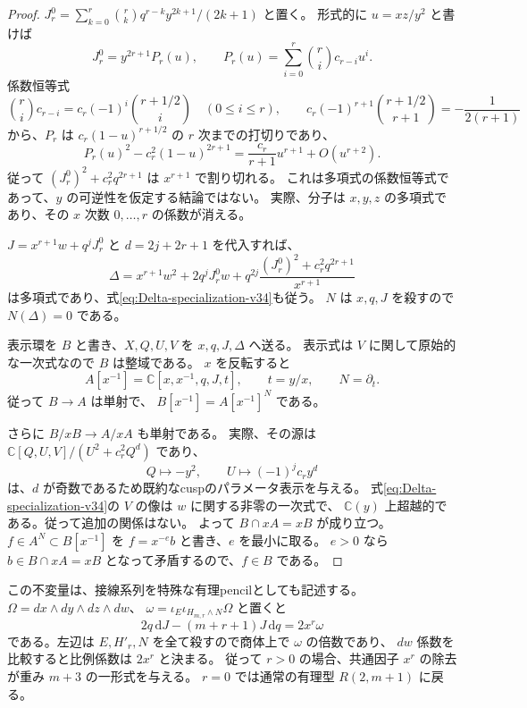 \begin{proof}
$J_r^0=\sum_{k=0}^r\binom rk q^{r-k}y^{2k+1}/(2k+1)$ と置く。
形式的に $u=xz/y^2$ と書けば
\[
 J_r^0=y^{2r+1}P_r(u),\qquad
 P_r(u)=\sum_{i=0}^r\binom ri c_{r-i}u^i.
\]
係数恒等式
\[
 \binom ri c_{r-i}
 =c_r(-1)^i\binom{r+1/2}{i}\quad(0\le i\le r),\qquad
 c_r(-1)^{r+1}\binom{r+1/2}{r+1}=-\frac1{2(r+1)}
\]
から、$P_r$ は $c_r(1-u)^{r+1/2}$ の $r$ 次までの打切りであり、
\[
 P_r(u)^2-c_r^2(1-u)^{2r+1}
 =\frac{c_r}{r+1}u^{r+1}+O(u^{r+2}).
\]
従って $(J_r^0)^2+c_r^2q^{2r+1}$ は $x^{r+1}$ で割り切れる。
これは多項式の係数恒等式であって、$y$ の可逆性を仮定する結論ではない。
実際、分子は $x,y,z$ の多項式であり、その $x$ 次数 $0,\ldots,r$ の係数が消える。

$J=x^{r+1}w+q^jJ_r^0$ と $d=2j+2r+1$ を代入すれば、
\[
 \Delta=x^{r+1}w^2+2q^jJ_r^0w
       +q^{2j}\frac{(J_r^0)^2+c_r^2q^{2r+1}}{x^{r+1}}
\]
は多項式であり、式\eqref{eq:Delta-specialization-v34}も従う。
$N$ は $x,q,J$ を殺すので $N(\Delta)=0$ である。

表示環を $B$ と書き、$X,Q,U,V$ を $x,q,J,\Delta$ へ送る。
表示式は $V$ に関して原始的な一次式なので $B$ は整域である。
$x$ を反転すると
\[
 A[x^{-1}]=\mathbb C[x,x^{-1},q,J,t],\qquad t=y/x,\qquad N=\partial_t.
\]
従って $B\to A$ は単射で、
$B[x^{-1}]=A[x^{-1}]^N$ である。

さらに $B/xB\to A/xA$ も単射である。
実際、その源は
$\mathbb C[Q,U,V]/(U^2+c_r^2Q^d)$ であり、
\[
 Q\longmapsto-y^2,\qquad U\longmapsto(-1)^jc_ry^d
\]
は、$d$ が奇数であるため既約なcuspのパラメータ表示を与える。
式\eqref{eq:Delta-specialization-v34}の $V$ の像は $w$ に関する非零の一次式で、
$\mathbb C(y)$ 上超越的である。従って追加の関係はない。
よって $B\cap xA=xB$ が成り立つ。
$f\in A^N\subset B[x^{-1}]$ を $f=x^{-e}b$ と書き、$e$ を最小に取る。
$e>0$ なら $b\in B\cap xA=xB$ となって矛盾するので、$f\in B$ である。
\end{proof}

この不変量は、接線系列を特殊な有理pencilとしても記述する。
$\Omega=dx\wedge dy\wedge dz\wedge dw$、
$\omega=\iota_E\iota_{H_{m,r}\wedge N}\Omega$ と置くと
\[
 2q\,\mathrm dJ-(m+r+1)J\,\mathrm dq=2x^r\omega
\]
である。左辺は $E,H'_r,N$ を全て殺すので商体上で $\omega$ の倍数であり、
$dw$ 係数を比較すると比例係数は $2x^r$ と決まる。
従って $r>0$ の場合、共通因子 $x^r$ の除去が重み $m+3$ の一形式を与える。
$r=0$ では通常の有理型 $R(2,m+1)$ に戻る。

